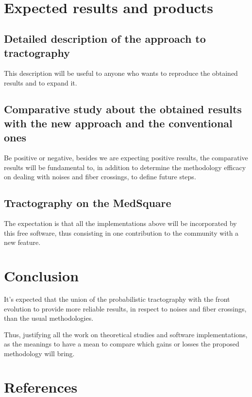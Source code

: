 \documentclass[a4paper,11pt]{report}
\begin{document}
\chapter{Expected results and products}
  \section{Detailed description of the approach to tractography}
  This description will be useful to anyone who wants to reproduce the obtained results and to expand it.

  \section{Comparative study about the obtained results with the new approach and the conventional ones}
  Be positive or negative, besides we are expecting positive results, the comparative results will be fundamental to, in addition to determine the methodology efficacy on dealing with noises and fiber crossings, to define future steps.

  \section{Tractography on the MedSquare}
  The expectation is that all the implementations above will be incorporated by this free software, thus consisting in one contribution to the community with a new feature.

\chapter{Conclusion}
It's expected that the union of the probabilistic tractography with the front evolution to provide more reliable results, in respect to noises and fiber crossings, than the usual methodologies.

Thus, justifying all the work on theoretical studies and software implementations, as the meanings to have a mean to compare which gains or losses the proposed methodology will bring.

\chapter{References} \label{ch: biblio}
\end{document}
